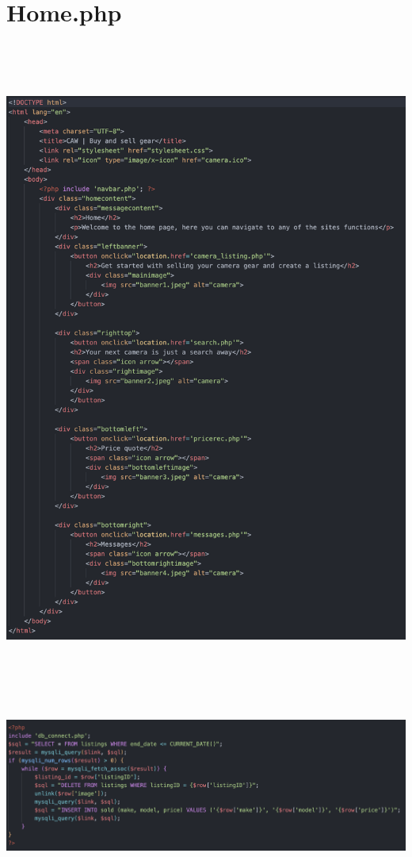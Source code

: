 \section*{Home.php}\includegraphics[width=6.26806in,height=8.52892in]{ch6_appendix/media/image5.png}

\includegraphics[width=6.26806in,height=2.04653in]{ch6_appendix/media/image6.png}

